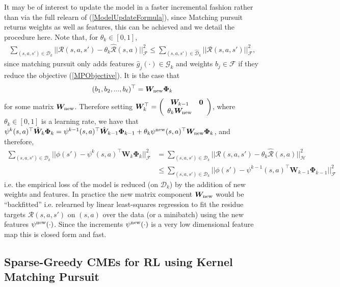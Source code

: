 \documentclass[letterpaper]{article}
\newcommand{\cD}{{\mathcal D}}
\newcommand{\cH}{{\mathcal H}}
\newcommand{\cF}{{\mathcal F}}
\newcommand{\cR}{{\mathcal R}}
\newcommand{\cG}{{\mathcal G}}
\newcommand{\bW}{{\bm W}}
\newcommand{\bPhi}{{\bm \Phi}}
\newcommand{\nn}{\nonumber}
\newcommand{\bzero}{{\bm 0}}
\begin{document}
It may be of interest to update the model in a faster incremental fashion rather than via the full relearn of (\ref{ModelUpdateFormula}), since Matching pursuit returns weights as well as features, this can be achieved and we detail the procedure here. Note that, for $\theta_k\in[0,1]$,
\begin{align}
\sum_{(s,a,s')\in\cD_k} || \cR(s,a,s') - \theta_k \hat\cR(s,a) ||^2_{\cF} \le  \sum_{(s,a,s')\in\hat\cD_k} || \cR(s,a,s') ||^2_{\cF}, \nn
\end{align}
since matching pursuit only adds features $\hat g_j(\cdot)\in\cG_k$ and weights $b_j\in\cF$ if they reduce the objective (\ref{MPObjective}). It is the case that
\begin{align}
(b_1, b_2,...,b_\ell)^\top = \bW_{\rm new} \bPhi_{k}
\end{align}
for some matrix $\bW_{\rm new}$. Therefore setting $\bW^\top_k =  \left( \begin{array}{cc}
 \bW_{k-1} &  \bzero  \\
\theta_k \bW_{\rm new} \end{array} \right)$,  where $\theta_k\in[0,1]$ is a learning rate, we have that
$\psi^k(s,a)^\top\hat\bW_k \bPhi_k =  \psi^{k-1}(s,a)^\top\hat\bW_{k-1}\bPhi_{k-1} + \theta_k \psi^{\rm new}(s,a)^\top \bW_{\rm new}\bPhi_k$, and therefore,
\begin{align}
\sum_{(s,a,s')\in\cD_k} || \phi(s') -\psi^k(s,a)^\top\bW_k \bPhi_k  ||^2_{\cF} &=\sum_{(s,a,s')\in\cD_k} || \cR(s,a,s') - \theta_k \hat\cR(s,a) ||^2_{\cH}\nn\\
&\le \sum_{(s,a,s')\in\cD_k} || \phi(s') -  \psi^{k-1}(s,a)^\top\bW_{k-1} \bPhi_{k-1}||^2_{\cF} \nn
\end{align}
i.e. the empirical loss of the model is reduced (on $\cD_k$) by the addition of new weights and features. In practice the new matrix component $\bW_{\rm new}$ would be ``backfitted'' i.e. relearned by linear least-squares regression to fit the residue targets $\cR(s,a,s')$ on $(s,a)$ over the data (or a minibatch) using the new features $\psi^{\rm new}(\cdot)$. Since the increments $\psi^{\rm new}(\cdot)$ is a very low dimensional feature map this is closed form and fast.





\subsection{Sparse-Greedy CMEs for RL using Kernel Matching Pursuit} \label{FeatureLearning}
\end{document}

